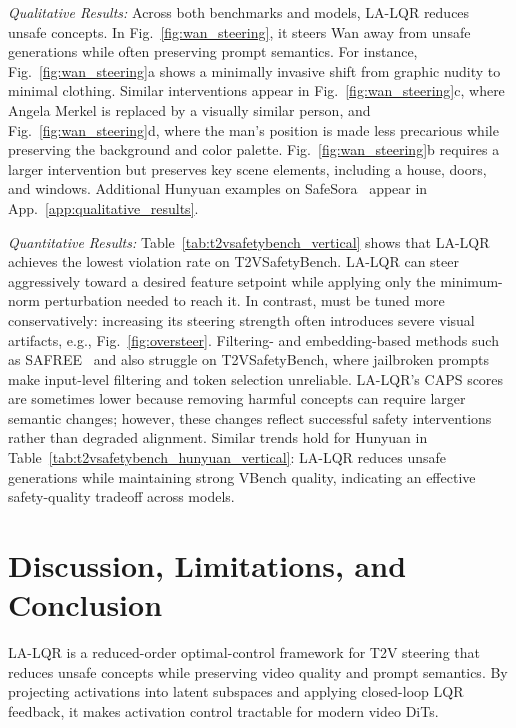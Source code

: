 \documentclass{article}
\begin{document}
\noindent \textit{Qualitative Results:\quad} Across both benchmarks and models, LA-LQR reduces unsafe concepts. In Fig.~\ref{fig:wan_steering}, it steers Wan away from unsafe generations while often preserving prompt semantics. For instance, Fig.~\ref{fig:wan_steering}a shows a minimally invasive shift from graphic nudity to minimal clothing. Similar interventions appear in Fig.~\ref{fig:wan_steering}c, where Angela Merkel is replaced by a visually similar person, and Fig.~\ref{fig:wan_steering}d, where the man's position is made less precarious while preserving the background and color palette. Fig.~\ref{fig:wan_steering}b requires a larger intervention but preserves key scene elements, including a house, doors, and windows. Additional Hunyuan examples on SafeSora~\cite{dai2024safesora} appear in App.~\ref{app:qualitative_results}.

\noindent \textit{Quantitative Results:\quad} Table~\ref{tab:t2vsafetybench_vertical} shows that LA-LQR achieves the lowest violation rate on T2VSafetyBench. LA-LQR can steer aggressively toward a desired feature setpoint while applying only the minimum-norm perturbation needed to reach it. In contrast, \cite{facchiano2025video} must be tuned more conservatively: increasing its steering strength often introduces severe visual artifacts, e.g., Fig.~\ref{fig:oversteer}. Filtering- and embedding-based methods such as SAFREE~\cite{yoon2024safree} and \cite{ekin2026unreasonable} also struggle on T2VSafetyBench, where jailbroken prompts make input-level filtering and token selection unreliable. LA-LQR's CAPS scores are sometimes lower because removing harmful concepts can require larger semantic changes; however, these changes reflect successful safety interventions rather than degraded alignment. Similar trends hold for Hunyuan in Table~\ref{tab:t2vsafetybench_hunyuan_vertical}: LA-LQR reduces unsafe generations while maintaining strong VBench quality, indicating an effective safety-quality tradeoff across models.

\vspace{-8pt}
\section{Discussion, Limitations, and Conclusion}\label{sec:conclusion}
\vspace{-8pt}

LA-LQR is a reduced-order optimal-control framework for T2V steering that reduces unsafe concepts while preserving video quality and prompt semantics. By projecting activations into latent subspaces and applying closed-loop LQR feedback, it makes activation control tractable for modern video DiTs.
\end{document}
